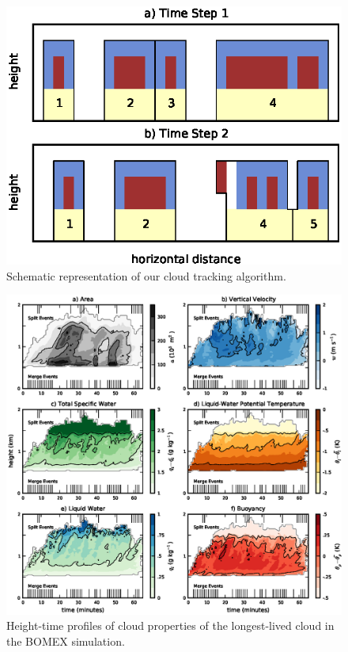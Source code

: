 \documentclass[acp]{copernicus}
\begin{document}
\begin{figure}[t]
\vspace*{2mm}
\begin{center}
\includegraphics[width=\textwidth]{./figures/cloudfinder_instructions}
\end{center}
\caption{Schematic representation of our cloud tracking algorithm.}
\label{fig:cloudfinder_instructions}
\end{figure}

\begin{figure}[t]
\vspace*{2mm}
\begin{center}
\includegraphics[width=\textwidth]{./figures/example_cloud}
\end{center}
\caption{Height-time profiles of cloud properties of the longest-lived cloud 
in the BOMEX simulation.}
\label{fig:example_cloud}
\end{figure}
\end{document}
